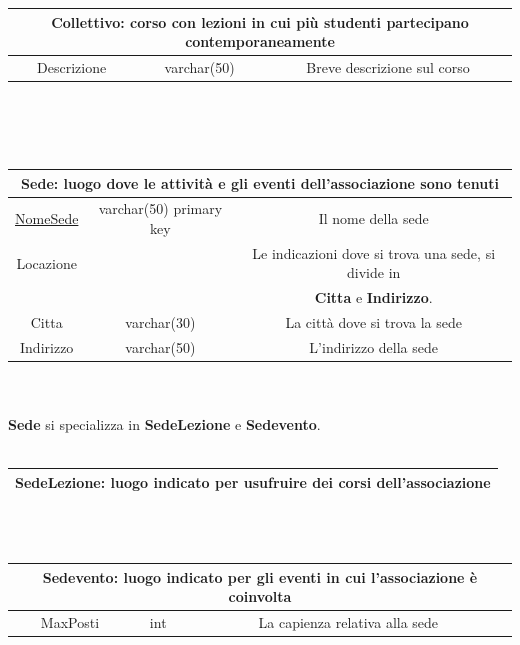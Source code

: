 \documentclass[11pt]{article}
\begin{document}
		\\\\
		\begin{tabular}{|c|c|c|}
			\hline
			\multicolumn{3}{|c|}{\textbf{Collettivo}: corso con lezioni in cui più studenti partecipano contemporaneamente}\\
			\hline
			Descrizione & varchar(50) & Breve descrizione sul corso\\
			\hline
		\end{tabular}
		\\\\\\
		\begin{tabular}{|c|c|c|}
			\hline
			\multicolumn{3}{|c|}{\textbf{Sede}: luogo dove le attività e gli eventi dell'associazione sono tenuti}\\
			\hline
			\underline{NomeSede} & varchar(50) primary key & Il nome della sede\\
			\hline
			Locazione &  & Le indicazioni dove si trova una sede, si divide in\\
			&  &\textbf{Citta} e \textbf{Indirizzo}.\\
			Citta & varchar(30) & La città dove si trova la sede\\
			Indirizzo & varchar(50) & L'indirizzo della sede\\
			\hline
		\end{tabular}
		\\\\ \textbf{Sede} si specializza in \textbf{SedeLezione} e \textbf{Sedevento}.\\\\
		\begin{tabular}{|c|c|c|}
			\hline
			\multicolumn{3}{|c|}{\textbf{SedeLezione}: luogo indicato per usufruire dei corsi dell'associazione}\\
			\hline
		\end{tabular}
		\\\\
		\begin{tabular}{|c|c|c|}
			\hline
			\multicolumn{3}{|c|}{\textbf{Sedevento}: luogo indicato per gli eventi in cui l'associazione è coinvolta}\\
			\hline
			MaxPosti & int & La capienza relativa alla sede\\
			\hline
		\end{tabular}
		\\\\\\
\end{document}
